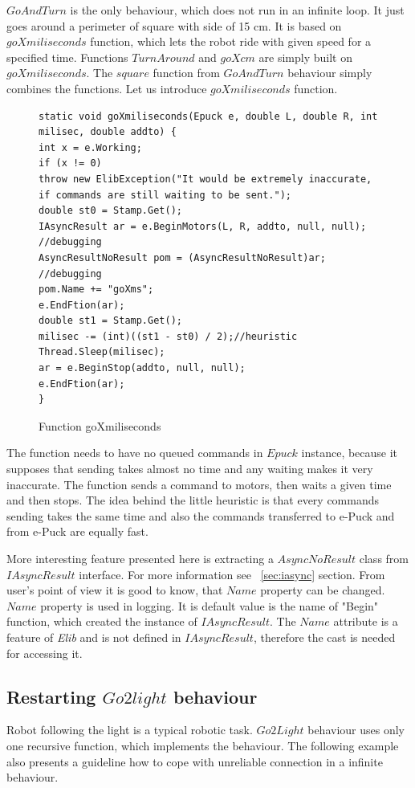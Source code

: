   $GoAndTurn$ is the only behaviour, which does not run in an infinite loop. 
  It just goes around a perimeter of square with side
  of 15 cm. It is based on $goXmiliseconds$ function, which lets the robot ride with given speed for a specified time.
  Functions $TurnAround$ and $goXcm$ are simply built on $goXmiliseconds$. The $square$ function from $GoAndTurn$ behaviour
  simply combines the functions.
  Let us introduce $goXmiliseconds$ function.
\begin{figure}[!hbp]
\begin{lstlisting}
static void goXmiliseconds(Epuck e, double L, double R, int milisec, double addto) {
int x = e.Working;
if (x != 0)
throw new ElibException("It would be extremely inaccurate, if commands are still waiting to be sent.");
double st0 = Stamp.Get();
IAsyncResult ar = e.BeginMotors(L, R, addto, null, null);
//debugging
AsyncResultNoResult pom = (AsyncResultNoResult)ar;
//debugging
pom.Name += "goXms";
e.EndFtion(ar);
double st1 = Stamp.Get();
milisec -= (int)((st1 - st0) / 2);//heuristic
Thread.Sleep(milisec);
ar = e.BeginStop(addto, null, null);
e.EndFtion(ar);
}
\end{lstlisting}
\caption{Function goXmiliseconds} \label{gox}
\end{figure}

  The function needs to have no queued commands in $Epuck$ instance, 
  because it supposes that sending takes almost no time and any waiting makes it very inaccurate.
  The function sends a command to motors, then waits a given time and then stops.
  The idea behind the little heuristic is that every commands sending takes the 
  same time and also the commands transferred to e-Puck and from e-Puck are equally fast.

  More interesting feature presented here is extracting a $AsyncNoResult$ class from $IAsyncResult$ interface. 
  For more information see ~\ref{sec:iasync} section.
  From user's point of view it is good to know, that $Name$ property can be changed. $Name$ property is used in logging. 
  It is default value is the name of "Begin" function,
  which created the instance of $IAsyncResult$. The $Name$ attribute is a feature of {\it Elib} 
  and is not defined in $IAsyncResult$, therefore the cast is needed for accessing it.

\subsection{Restarting $Go2light$ behaviour}\label{sec:go2light}
  Robot following the light is a typical robotic task. $Go2Light$ behaviour uses only one recursive function, which implements the behaviour.
  The following example also presents a guideline how to cope with unreliable connection in a infinite behaviour.

